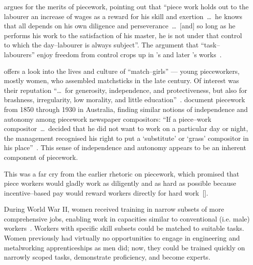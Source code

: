 \documentclass[trackingWork]{subfiles}
\begin{document}
\citeauthor{hughRaynbirdTaskWork} argues for the merits of piecework,
pointing out that
``piece work holds out to the labourer an increase of wages as a reward for his skill and exertion~\dots~he knows that all depends on his own diligence and perseverance~\dots~[and] so long as he performs his work to the satisfaction of his master, he is not under that control to which the day--labourer is always subject''.
The argument that ``task--labourers'' enjoy freedom from control crops up in \citeauthor{hughRaynbirdTaskWork}'s and later \citeauthor{rowan1901premium}'s works~\cite{hughRaynbirdTaskWork,rowan1901premium}.

\citeauthor{10.2307/3827491} offers a look into the lives and culture of ``match--girls''
--- young pieceworkers, mostly women, who assembled matchsticks in the late  century.
Of interest was their reputation ``\dots~for generosity, independence, and protectiveness,
but also for brashness, irregularity, low morality, and little education''~\cite{10.2307/3827491}.
\citeauthor{10.2307/27508091} document piecework from 1850 through 1930 in Australia,
finding similar notions of independence and autonomy among piecework newspaper compositors:
``If a piece--work compositor~\dots~decided that he did not want to work on a particular day or night,
the management recognised his right to put a `substitute' or `grass' compositor in his place''~\cite{10.2307/27508091}.
This sense of independence and autonomy appears to be an inherent component of piecework.

This was a far cry from the earlier rhetoric on piecework, which promised that
piece workers would gladly work as diligently and as hard as possible because
incentive--based pay would reward workers directly for hard work~[].


During World War II, women received training in narrow subsets of more comprehensive jobs, enabling work in capacities similar to conventional (i.e. male) workers~\cite{hart2013rise}.
Workers with specific skill subsets could be matched to suitable tasks.
Women previously had virtually no opportunities
to engage in engineering and metalworking apprenticeships as men did;
now, they
could be trained quickly on narrowly scoped tasks,
demonstrate proficiency, and become experts.
\end{document}
